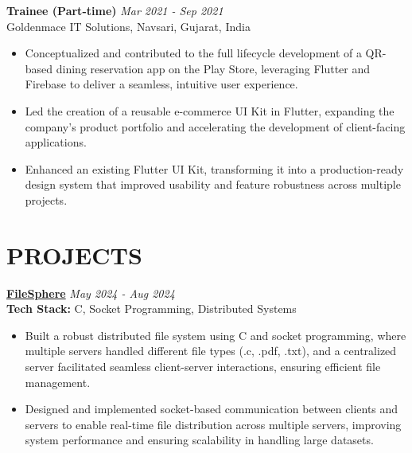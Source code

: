\documentclass[10pt, letterpaper]{article}
\begin{document}
\textbf{Trainee (Part-time)} \hfill \textit{Mar 2021 - Sep 2021} \\
Goldenmace IT Solutions, Navsari, Gujarat, India \\
\begin{itemize}
\vspace{-0.3cm}
    \item Conceptualized and contributed to the full lifecycle development of a QR-based dining reservation app on the Play Store, leveraging Flutter and Firebase to deliver a seamless, intuitive user experience.
    \item Led the creation of a reusable e-commerce UI Kit in Flutter, expanding the company’s product portfolio and accelerating the development of client-facing applications.
    \item Enhanced an existing Flutter UI Kit, transforming it into a production-ready design system that improved usability and feature robustness across multiple projects.
\end{itemize}

\vspace{0.1cm}
\section{PROJECTS}
\vspace{0.1cm}
\textbf{\href{https://github.com/yash-mandaviya/FileSphere}{FileSphere}} \hfill \textit{May 2024 - Aug 2024} \\
\textbf{Tech Stack:} C, Socket Programming, Distributed Systems \\
\begin{itemize}
\vspace{-0.3cm}
    \item Built a robust distributed file system using C and socket programming, where multiple servers handled different file types (.c, .pdf, .txt), and a centralized server facilitated seamless client-server interactions, ensuring efficient file management.
    \item Designed and implemented socket-based communication between clients and servers to enable real-time file distribution across multiple servers, improving system performance and ensuring scalability in handling large datasets.
\end{itemize}

\end{document}
